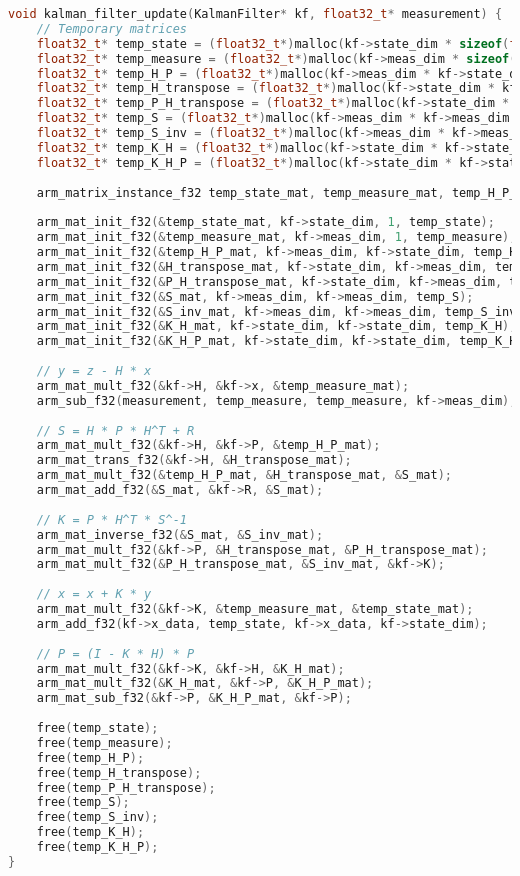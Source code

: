 \documentclass[11pt]{ucthesisCP}
\begin{document}
\begin{lstlisting}[language=C++]
void kalman_filter_update(KalmanFilter* kf, float32_t* measurement) {
	// Temporary matrices
	float32_t* temp_state = (float32_t*)malloc(kf->state_dim * sizeof(float32_t));
	float32_t* temp_measure = (float32_t*)malloc(kf->meas_dim * sizeof(float32_t));
	float32_t* temp_H_P = (float32_t*)malloc(kf->meas_dim * kf->state_dim * sizeof(float32_t));
	float32_t* temp_H_transpose = (float32_t*)malloc(kf->state_dim * kf->meas_dim * sizeof(float32_t));
	float32_t* temp_P_H_transpose = (float32_t*)malloc(kf->state_dim * kf->meas_dim * sizeof(float32_t));
	float32_t* temp_S = (float32_t*)malloc(kf->meas_dim * kf->meas_dim * sizeof(float32_t));
	float32_t* temp_S_inv = (float32_t*)malloc(kf->meas_dim * kf->meas_dim * sizeof(float32_t));
	float32_t* temp_K_H = (float32_t*)malloc(kf->state_dim * kf->state_dim * sizeof(float32_t));
	float32_t* temp_K_H_P = (float32_t*)malloc(kf->state_dim * kf->state_dim * sizeof(float32_t));
	
	arm_matrix_instance_f32 temp_state_mat, temp_measure_mat, temp_H_P_mat, H_transpose_mat, P_H_transpose_mat, S_mat, S_inv_mat, K_H_mat, K_H_P_mat;
	
	arm_mat_init_f32(&temp_state_mat, kf->state_dim, 1, temp_state);
	arm_mat_init_f32(&temp_measure_mat, kf->meas_dim, 1, temp_measure);
	arm_mat_init_f32(&temp_H_P_mat, kf->meas_dim, kf->state_dim, temp_H_P);
	arm_mat_init_f32(&H_transpose_mat, kf->state_dim, kf->meas_dim, temp_H_transpose);
	arm_mat_init_f32(&P_H_transpose_mat, kf->state_dim, kf->meas_dim, temp_P_H_transpose);
	arm_mat_init_f32(&S_mat, kf->meas_dim, kf->meas_dim, temp_S);
	arm_mat_init_f32(&S_inv_mat, kf->meas_dim, kf->meas_dim, temp_S_inv);
	arm_mat_init_f32(&K_H_mat, kf->state_dim, kf->state_dim, temp_K_H);
	arm_mat_init_f32(&K_H_P_mat, kf->state_dim, kf->state_dim, temp_K_H_P);
	
	// y = z - H * x
	arm_mat_mult_f32(&kf->H, &kf->x, &temp_measure_mat);
	arm_sub_f32(measurement, temp_measure, temp_measure, kf->meas_dim);
	
	// S = H * P * H^T + R
	arm_mat_mult_f32(&kf->H, &kf->P, &temp_H_P_mat);
	arm_mat_trans_f32(&kf->H, &H_transpose_mat);
	arm_mat_mult_f32(&temp_H_P_mat, &H_transpose_mat, &S_mat);
	arm_mat_add_f32(&S_mat, &kf->R, &S_mat);
	
	// K = P * H^T * S^-1
	arm_mat_inverse_f32(&S_mat, &S_inv_mat);
	arm_mat_mult_f32(&kf->P, &H_transpose_mat, &P_H_transpose_mat);
	arm_mat_mult_f32(&P_H_transpose_mat, &S_inv_mat, &kf->K);
	
	// x = x + K * y
	arm_mat_mult_f32(&kf->K, &temp_measure_mat, &temp_state_mat);
	arm_add_f32(kf->x_data, temp_state, kf->x_data, kf->state_dim);
	
	// P = (I - K * H) * P
	arm_mat_mult_f32(&kf->K, &kf->H, &K_H_mat);
	arm_mat_mult_f32(&K_H_mat, &kf->P, &K_H_P_mat);
	arm_mat_sub_f32(&kf->P, &K_H_P_mat, &kf->P);
	
	free(temp_state);
	free(temp_measure);
	free(temp_H_P);
	free(temp_H_transpose);
	free(temp_P_H_transpose);
	free(temp_S);
	free(temp_S_inv);
	free(temp_K_H);
	free(temp_K_H_P);
}
\end{lstlisting}
\end{document}
